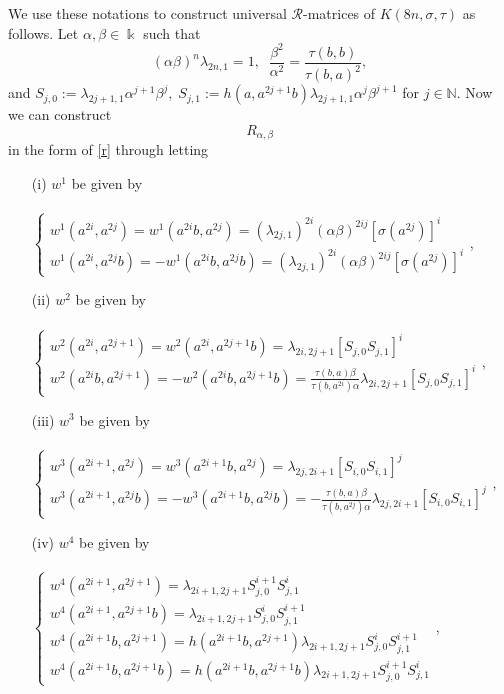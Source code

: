 \documentclass[a4paper,11pt]{amsart}
\numberwithin{equation}{section}
\begin{document}
We use these notations to construct universal $\mathcal{R}$-matrices of $K(8n,\sigma,\tau)$ as follows. Let $\alpha,\beta \in \Bbbk$ such that $$(\alpha\beta)^n\lambda_{2n,1}=1,\;\;\frac{\beta^2}{\alpha^2}
=\frac{\tau(b,b)}{\tau(b,a)^2},$$  and $S_{j,0}:=\lambda_{2j+1,1}\alpha^{j+1}\beta^j,\;S_{j,1}:=h(a,a^{2j+1}b)\lambda_{2j+1,1}\alpha^j\beta^{j+1}$ for $j\in \mathbb{N}$. Now we can construct    $$R_{\alpha,\beta}$$
 in the form of \eqref{r} through letting
\begin{itemize}
\item[(i)] $w^1$ be given by \\\\
$ \left\{
\begin{array}{l}
w^1(a^{2i},a^{2j})=w^1(a^{2i}b,a^{2j})
=(\lambda_{2j,1})^{2i}(\alpha\beta)^{2ij}[\sigma(a^{2j})]^i \\
w^1(a^{2i},a^{2j}b)=-w^1(a^{2i}b,a^{2j}b)
=(\lambda_{2j,1})^{2i}(\alpha\beta)^{2ij}[\sigma(a^{2j})]^i
\end{array}\right.$,\\

\item[(ii)] $w^2$ be given by  \\\\
$ \left\{
\begin{array}{l}
w^2(a^{2i},a^{2j+1})=w^2(a^{2i},a^{2j+1}b)=\lambda_{2i,2j+1}[S_{j,0}S_{j,1}]^{i}\\
w^2(a^{2i}b,a^{2j+1})=-w^2(a^{2i}b,a^{2j+1}b)=\frac{\tau(b,a)\beta}{\tau(b,a^{2i})\alpha}
\lambda_{2i,2j+1}[S_{j,0}S_{j,1}]^{i}
\end{array} \right.$,\\

\item[(iii)] $w^3$ be given by \\\\
$ \left\{
\begin{array}{l}
w^3(a^{2i+1},a^{2j})=w^3(a^{2i+1}b,a^{2j})=\lambda_{2j,2i+1}[S_{i,0}S_{i,1}]^{j}\\
w^3(a^{2i+1},a^{2j}b)=-w^3(a^{2i+1}b,a^{2j}b)=-\frac{\tau(b,a)\beta}{\tau(b,a^{2j})\alpha}
\lambda_{2j,2i+1}[S_{i,0}S_{i,1}]^{j}
\end{array} \right.$,\\

 \item[(iv)] $w^4$ be given by \\\\
$ \left\{
\begin{array}{l}
w^4(a^{2i+1},a^{2j+1})=\lambda_{2i+1,2j+1}S_{j,0}^{i+1}S_{j,1}^{i} \\
w^4(a^{2i+1},a^{2j+1}b)=\lambda_{2i+1,2j+1}S_{j,0}^{i}S_{j,1}^{i+1} \\
w^4(a^{2i+1}b,a^{2j+1})=h(a^{2i+1}b,a^{2j+1})\lambda_{2i+1,2j+1}S_{j,0}^{i}S_{j,1}^{i+1}\\
w^4(a^{2i+1}b,a^{2j+1}b)=h(a^{2i+1}b,a^{2j+1}b)\lambda_{2i+1,2j+1}S_{j,0}^{i+1}S_{j,1}^{i}
\end{array} \right.$,
            \end{itemize}
\end{document}

